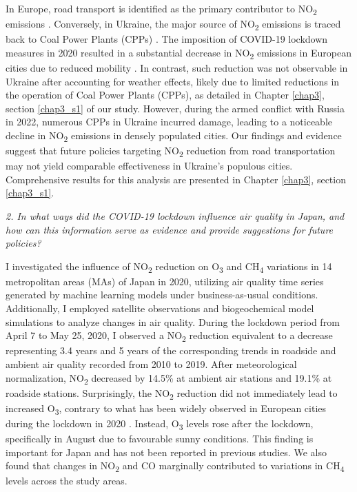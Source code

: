In Europe, road transport is identified as the primary contributor to NO\textsubscript{2} emissions \citep{aq2020eu}. Conversely, in Ukraine, the major source of NO\textsubscript{2} emissions is traced back to Coal Power Plants (CPPs) \citep{lauri2021}. The imposition of COVID-19 lockdown measures in 2020 resulted in a substantial decrease in NO\textsubscript{2} emissions in European cities due to reduced mobility \citep{barre2021estimating, grange2021covid}. In contrast, such reduction was not observable in Ukraine after accounting for weather effects, likely due to limited reductions in the operation of Coal Power Plants (CPPs), as detailed in Chapter \ref{chap3}, section \ref{chap3_s1} of our study. However, during the armed conflict with Russia in 2022, numerous CPPs in Ukraine incurred damage, leading to a noticeable decline in NO\textsubscript{2} emissions in densely populated cities. Our findings and evidence suggest that future policies targeting NO\textsubscript{2} reduction from road transportation may not yield comparable effectiveness in Ukraine's populous cities. Comprehensive results for this analysis are presented in Chapter \ref{chap3}, section \ref{chap3_s1}. \par

\textit{2. In what ways did the COVID-19 lockdown influence air quality in Japan, and how can this information serve as evidence and provide suggestions for future policies?} \par
I investigated the influence of NO\textsubscript{2} reduction on O\textsubscript{3} and CH\textsubscript{4} variations in 14 metropolitan areas (MAs) of Japan in 2020, utilizing air quality time series generated by machine learning models under business-as-usual conditions. Additionally, I employed satellite observations and biogeochemical model simulations to analyze changes in air quality. During the lockdown period from April 7 to May 25, 2020, I observed a NO\textsubscript{2} reduction equivalent to a decrease representing 3.4 years and 5 years of the corresponding trends in roadside and ambient air quality recorded from 2010 to 2019. After meteorological normalization, NO\textsubscript{2} decreased by 14.5\% at ambient air stations and 19.1\% at roadside stations. Surprisingly, the NO\textsubscript{2} reduction did not immediately lead to increased O\textsubscript{3}, contrary to what has been widely observed in European cities during the lockdown in 2020 \citep{grange2021covid,shi2021abrupt}. Instead, O\textsubscript{3} levels rose after the lockdown, specifically in August due to favourable sunny conditions. This finding is important for Japan and has not been reported in previous studies. We also found that changes in NO\textsubscript{2} and CO marginally contributed to variations in CH\textsubscript{4} levels across the study areas. \par

